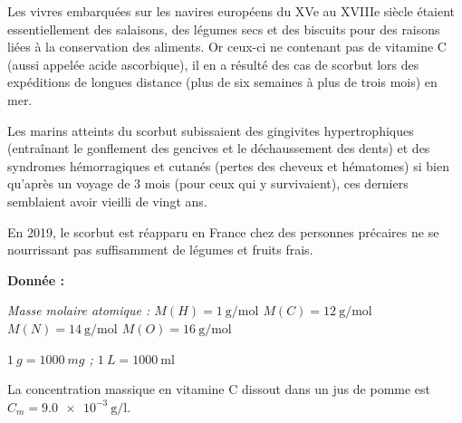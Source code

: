 \vspace{24pt}

\medskip
Les vivres embarquées sur les navires européens du XVe au XVIIIe siècle étaient essentiellement des salaisons, des légumes secs et des biscuits pour des raisons liées à la conservation des aliments. Or ceux-ci ne contenant pas de vitamine C (aussi appelée acide ascorbique), il en a résulté des cas de scorbut lors des expéditions de longues distance (plus de six semaines à plus de trois mois) en mer.

\medskip
Les marins atteints du scorbut subissaient des gingivites hypertrophiques (entraînant le gonflement des gencives et le déchaussement des dents) et des syndromes hémorragiques et cutanés (pertes des cheveux et hématomes) si bien qu'après un voyage de 3 mois (pour ceux qui y survivaient), ces derniers semblaient avoir vieilli de vingt ans. 

\medskip
En 2019, le scorbut est réapparu en France chez des personnes précaires ne se nourrissant pas suffisamment de légumes et fruits frais.

\medskip

\medskip
\textbf{Donnée : } 

\textit{Masse molaire atomique : $M(H) = \qty{1} {\g\per\mole}$ $M(C) = \qty{12} {\g\per\mole}$ $M(N) = \qty{14} {\g\per\mole}$ $M(O) = \qty{16} {\g\per\mole}$}

\textit{ $\qty{1} {g} = \qty{1 000} {mg}$   ;  $\qty{1} {L} = \qty{1 000} {\ml}$ }

\bigskip
{}

La concentration massique en vitamine C dissout dans un jus de pomme est $C_m = \qty{9,0e-3}{\g\per\litre}$.



